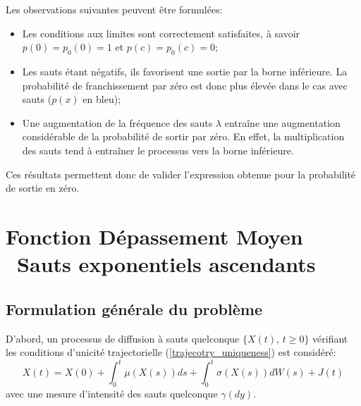 Les observations suivantes peuvent être formulées:
\begin{itemize}
    \item Les conditions aux limites sont correctement satisfaites, à savoir \( p(0) = p_0(0) = 1 \) et \( p(c) = p_0(c) = 0 \);
    \item Les sauts étant négatifs, ils favorisent une sortie par la borne inférieure. La probabilité de franchissement par zéro est donc plus élevée dans le cas avec sauts ($p(x)$ en bleu);
    \item Une augmentation de la fréquence des sauts $\lambda$ entraîne une augmentation considérable de la probabilité de sortir par zéro. En effet, la multiplication des sauts tend à entraîner le processus vers la borne inférieure.
\end{itemize}
Ces résultats permettent donc de valider l'expression obtenue pour la probabilité de sortie en zéro.

\section{Fonction Dépassement Moyen \textemdash~Sauts exponentiels ascendants}
\subsection{Formulation générale du problème}
D'abord, un processus de diffusion à sauts quelconque \(\{X(t),\,t\geq0\}\) vérifiant les conditions d'unicité trajectorielle (\ref{trajecotry_uniqueness}) est considéré:
\[
X(t)=X(0)+\int_0^t \mu(X(s))ds+\int_0^t\sigma(X(s))dW(s)+J(t)
\]
avec une mesure d'intensité des sauts quelconque $\gamma(dy)$.


